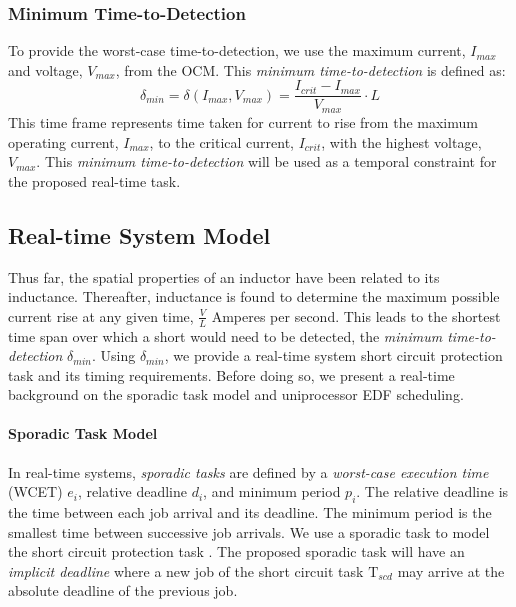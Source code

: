 \subsubsection{Minimum Time-to-Detection}
To provide the worst-case time-to-detection, we use the maximum current, $I_{max}$ and voltage, $V_{max}$, from the OCM.
This \textit{minimum time-to-detection} is defined as:
\begin{equation}\label{eq:MinTimeToDetect}
\delta_{min} = \delta(I_{max},V_{max}) = \frac{I_{crit}-I_{max}}{V_{max}}\cdot L
\end{equation}
This time frame represents time taken for current to rise from the maximum operating current, $I_{max}$, to the critical current, $I_{crit}$, with the highest voltage, $V_{max}$.
This \textit{minimum time-to-detection} will be used as a temporal constraint for the proposed real-time task.
\clearpage \subsection{Real-time System Model}\label{subsec:real-time system model}
Thus far, the spatial properties of an inductor have been related to its inductance.
Thereafter, inductance is found to determine the maximum possible current rise at any given time, $\frac{V}{L}$ Amperes per second.
This leads to the shortest time span over which a short would need to be detected, the \textit{minimum time-to-detection} $\delta_{min}$.
Using $\delta_{min}$, we provide a real-time system short circuit protection task and its timing requirements.
Before doing so, we present a real-time background on the sporadic task model and uniprocessor EDF scheduling.

\paragraph{Sporadic Task Model}
In real-time systems, \textit{sporadic tasks} are defined by a \textit{worst-case execution time} (WCET) $e_{i}$, relative deadline $d_{i}$, and minimum period $p_{i}$.
The relative deadline is the time between each job arrival and its deadline.
The minimum period is the smallest time between successive job arrivals.
We use a sporadic task to model the short circuit protection task \cite{mok_fundamental_1983}.
The proposed sporadic task will have an \textit{implicit deadline} where a new job of the short circuit task $\mathrm{T}_{scd}$ may arrive at the absolute deadline of the previous job.

